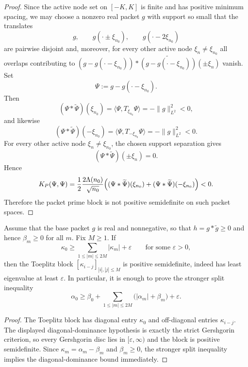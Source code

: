 \begin{proof}
Since the active node set on $[-K,K]$ is finite and has positive minimum spacing,
we may choose a nonzero real packet $g$ with support so small that the translates
\[
  g,\qquad g(\cdot\pm\xi_{n_0}),\qquad g(\cdot-2\xi_{n_0})
\]
are pairwise disjoint and, moreover, for every other active node $\xi_n\neq\xi_{n_0}$
all overlaps contributing to
$(g-g(\cdot-\xi_{n_0}))*\widetilde{(g-g(\cdot-\xi_{n_0}))}(\pm\xi_n)$
vanish. Set
\[
  \Psi:=g-g(\cdot-\xi_{n_0}).
\]
Then
\[
  (\Psi * \widetilde{\Psi})(\xi_{n_0})
  =
  \langle \Psi, T_{\xi_{n_0}}\Psi\rangle
  =
  -\|g\|_{L^2}^2<0,
\]
and likewise
\[
  (\Psi * \widetilde{\Psi})(-\xi_{n_0})
  =
  \langle \Psi, T_{-\xi_{n_0}}\Psi\rangle
  =
  -\|g\|_{L^2}^2<0.
\]
For every other active node $\xi_n\neq\xi_{n_0}$, the chosen support separation
gives
\[
  (\Psi * \widetilde{\Psi})(\pm\xi_n)=0.
\]
Hence
\[
  K_P(\Psi,\Psi)
  =
  \frac12\frac{2\Lambda(n_0)}{\sqrt{n_0}}
  \Bigl(
    (\Psi * \widetilde{\Psi})(\xi_{n_0})
    +
    (\Psi * \widetilde{\Psi})(-\xi_{n_0})
  \Bigr)
  <
  0.
\]
Therefore the packet prime block is not positive semidefinite on such packet spaces.
\end{proof}

\begin{proposition}\label{prop:packet-gershgorin}
Assume that the base packet $g$ is real and nonnegative, so that
$h=g*\widetilde g\ge0$ and hence $\beta_m\ge0$ for all $m$. Fix $M\ge1$. If
\[
  \kappa_0\ge \sum_{1\le |m|\le 2M} |\kappa_m|+\varepsilon
  \qquad\text{for some }\varepsilon>0,
\]
then the Toeplitz block $[\kappa_{i-j}]_{|i|,|j|\le M}$ is positive semidefinite,
indeed has least eigenvalue at least $\varepsilon$. In particular, it is enough
to prove the stronger split inequality
\[
  \alpha_0
  \ge
  \beta_0+\sum_{1\le |m|\le 2M}\bigl(|\alpha_m|+\beta_m\bigr)+\varepsilon.
\]
\end{proposition}

\begin{proof}
The Toeplitz block has diagonal entry $\kappa_0$ and off-diagonal entries
$\kappa_{i-j}$. The displayed diagonal-dominance hypothesis is exactly the
strict Gershgorin criterion, so every Gershgorin disc lies in
$[\varepsilon,\infty)$ and the block is positive semidefinite. Since
$\kappa_m=\alpha_m-\beta_m$ and $\beta_m\ge0$, the stronger split inequality
implies the diagonal-dominance bound immediately.
\end{proof}

